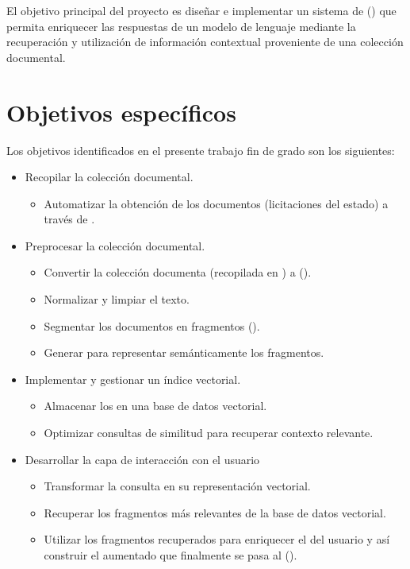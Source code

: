 
El objetivo principal del proyecto es diseñar e implementar un sistema de  () que permita enriquecer las respuestas de un modelo de lenguaje mediante la recuperación y utilización de información contextual proveniente de una colección documental. 

\section{Objetivos específicos}
Los objetivos identificados en el presente trabajo fin de grado son los siguientes:
\begin{itemize}
\tightlist
\item Recopilar la colección documental.
	\begin{itemize}
		\item Automatizar la obtención de los documentos (licitaciones del estado) a través de .
	\end{itemize}
\item Preprocesar la colección documental.
	\begin{itemize} 
		\item Convertir la colección documenta (recopilada en ) a  ().
		\item Normalizar y limpiar el texto.
		\item Segmentar los documentos en fragmentos ().
		\item Generar  para representar semánticamente los fragmentos.
	\end{itemize}
	\item Implementar y gestionar un índice vectorial.
	\begin{itemize}
		\item Almacenar los  en una base de datos vectorial.
		\item Optimizar consultas de similitud para recuperar contexto relevante.
	\end{itemize}
\item Desarrollar la capa de interacción con el usuario
	\begin{itemize}
		\item Transformar la consulta en su representación vectorial.
		\item Recuperar los fragmentos más relevantes de la base de datos vectorial.
		\item Utilizar los fragmentos recuperados para enriquecer el  del usuario y así construir el  aumentado que finalmente se pasa al  ().

\end{itemize}
\end{itemize}
